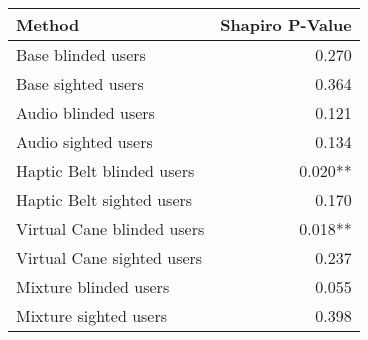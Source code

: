 
\centering
\begin{tabular}{lr}
\toprule
                    Method & Shapiro P-Value \\
\midrule
        Base blinded users &           0.270 \\
        Base sighted users &           0.364 \\
       Audio blinded users &           0.121 \\
       Audio sighted users &           0.134 \\
 Haptic Belt blinded users &         0.020** \\
 Haptic Belt sighted users &           0.170 \\
Virtual Cane blinded users &         0.018** \\
Virtual Cane sighted users &           0.237 \\
     Mixture blinded users &           0.055 \\
     Mixture sighted users &           0.398 \\
\bottomrule
\end{tabular}
